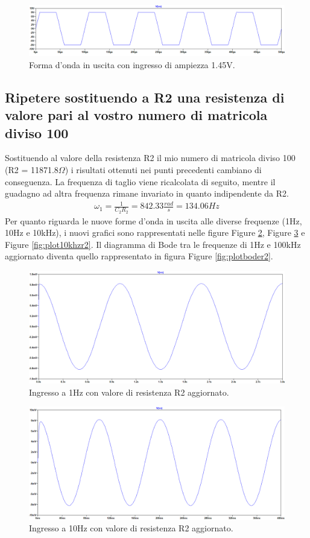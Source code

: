 \documentclass[a4paper,10pt]{article}
\begin{document}
\begin{figure}[h!]
	\centering
 	\includegraphics[width=1\linewidth]{plot1-4-2.png}
  	\caption{Forma d'onda in uscita con ingresso di ampiezza 1.45V.}
  	\label{fig:sat2}
\end{figure}

\subsection{Ripetere sostituendo a R2 una resistenza di valore pari al vostro numero di matricola diviso 100}
Sostituendo al valore della resistenza R2 il mio numero di matricola diviso 100 (R2 = 11871.8$\Omega$) i risultati ottenuti nei punti precedenti cambiano di conseguenza. La frequenza di taglio viene ricalcolata di seguito, mentre il guadagno ad altra frequenza rimane invariato in quanto indipendente da R2.
\begin{align*}
\omega_1 = \frac{1}{C_2R_2} = 842.33 \frac{rad}{s} = 134.06Hz
\end{align*}
Per quanto riguarda le nuove forme d'onda in uscita alle diverse frequenze (1Hz, 10Hz e 10kHz), i nuovi grafici sono rappresentati nelle figure Figure \ref{fig:plot1hzr2}, Figure \ref{fig:plot10hzr2} e Figure \ref{fig:plot10khzr2}. Il diagramma di Bode tra le frequenze di 1Hz e 100kHz aggiornato diventa quello rappresentato in figura Figure \ref{fig:plotboder2}.
\begin{figure}[h!]
	\centering
 	\includegraphics[width=0.6\linewidth]{plot1-5-1.png}
  	\caption{Ingresso a 1Hz con valore di resistenza R2 aggiornato.}
  	\label{fig:plot1hzr2}
\end{figure}

\begin{figure}[h!]
	\centering
 	\includegraphics[width=0.6\linewidth]{plot1-5-2.png}
  	\caption{Ingresso a 10Hz con valore di resistenza R2 aggiornato.}
  	\label{fig:plot10hzr2}
\end{figure}
\end{document}
